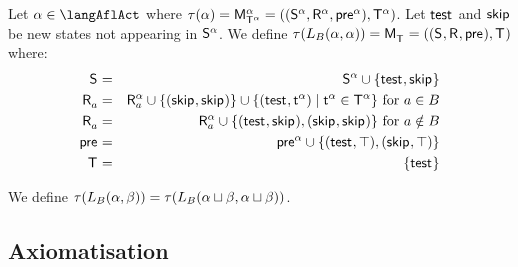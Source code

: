 \begin{definition}[Learning]\label{afl-k-learning}
Let $\alpha \in \langAflAct$ where $\tau(\alpha) = \aPModel[\alpha]{\aStatesT[\alpha]} = \aPModelTuple[\alpha]{\aStatesT[\alpha]}$.
Let $\aStateTest$ and $\aStateSkip$ be new states not appearing in $\aStates[\alpha]$.
We define $\tau(\learnsBs (\alpha, \alpha)) = \aPModel{\aStatesT} = \aPModelTuple{\aStatesT}$ where:
\begin{eqnarray*}
    \aStates &=& \aStates[\alpha] \cup \{\aStateTest, \aStateSkip\}\\
    \aAccessibility{\agentA} &=& \aAccessibility[\alpha]{\agentA} \cup \{(\aStateSkip, \aStateSkip)\} \cup \{(\aStateTest, \aStateT[\alpha]) \mid \aStateT[\alpha] \in \aStatesT[\alpha]\} \text{ for } \agentA \in \agentsB\\
    \aAccessibility{\agentA} &=& \aAccessibility[\alpha]{\agentA} \cup \{(\aStateTest, \aStateSkip), (\aStateSkip, \aStateSkip)\} \text{ for } \agentA \notin \agentsB\\
    \aPrecondition &=& \aPrecondition[\alpha] \cup \{(\aStateTest, \top), (\aStateSkip, \top)\}\\
    \aStatesT &=& \{\aStateTest\}
\end{eqnarray*}

We define $\tau(\learnsBs (\alpha, \beta)) = \tau(\learnsBs (\alpha \choice \beta, \alpha \choice \beta))$.
\end{definition}

\subsection{Axiomatisation}

